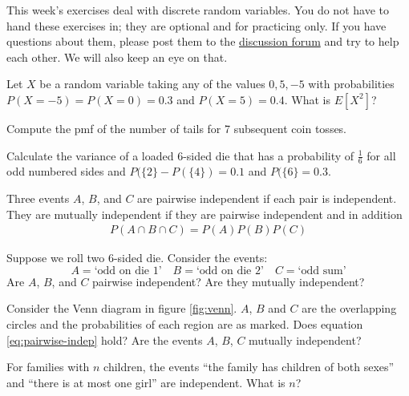 \documentclass[a4paper,10pt,landscape,twocolumn]{scrartcl}
\begin{document}
\practiceproblems

{\sffamily\noindent
This week's exercises deal with discrete random variables. You do not have to hand these exercises in; they are optional and for practicing only. If you have questions about them, please post them to the \href{https://www.moodle.ch/lms/mod/forum/view.php?id=1634}{discussion forum} and try to help each other. We will also keep an eye on that.
}


\begin{exercise}[]
Let $X$ be a random variable taking any of the values $0, 5, -5$ with probabilities $P(X=-5) = P(X	= 0) = 0.3$ and $P(X=5) = 0.4$. What is $E[X^2]$?
\end{exercise}

\begin{exercise}[]
Compute the pmf of the number of tails for 7 subsequent coin tosses.	
\end{exercise}

\begin{exercise}[]
	Calculate the variance of a loaded 6-sided die that has a probability of $\frac 1 6$ for all odd numbered sides and $P(\{2\} - P(\{4\}) =0.1$ and $P(\{6\} = 0.3$.
\end{exercise}


\begin{exercise}[Independence]
Three events $A$, $B$, and $C$ are pairwise independent if each pair is independent. They are mutually independent if they are pairwise independent and in addition
	\begin{align}\label{eq:pairwise-indep}
		P(A \cap B \cap C) = P(A) P(B) P(C)
	\end{align}
	\begin{subex}
	Suppose we roll two 6-sided die. Consider the events:
	\[
		A = \text{`odd on die 1'} \quad
		B = \text{`odd on die 2'} \quad
		C = \text{`odd sum'}
	\]
	Are $A$, $B$, and $C$ pairwise independent? Are they mutually independent?	
	\end{subex}
	
	\begin{subex}
		Consider the Venn diagram in figure \ref{fig:venn}. $A$, $B$ and $C$ are the overlapping circles and the probabilities of each region are as marked. Does equation \ref{eq:pairwise-indep} hold? Are the events $A$, $B$, $C$ mutually independent?
	\end{subex}
	
	\begin{subex}
	For families with $n$ children, the events ``the family has children of both sexes'' and ``there is at most one girl'' are independent. What is $n$?
	\end{subex}


\end{exercise}
\end{document}
